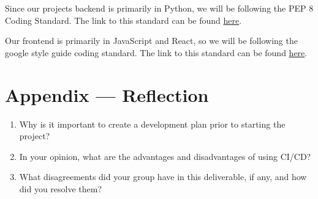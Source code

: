 \documentclass{article}
\begin{document}
Since our projects backend is primarily in Python, we will be following the PEP 8 Coding
Standard. The link to this standard can be found
\href{https://peps.python.org/pep-0008/}{here}.

\medskip

Our frontend is primarily in JavaScript and React, so we will be following the google style guide
coding standard. The link to this standard can be found \href{https://google.github.io/styleguide/jsguide.html}{here}.

\newpage{}

\section*{Appendix --- Reflection}

%

\begin{enumerate}
    \item Why is it important to create a development plan prior to starting the
    project?
    \item In your opinion, what are the advantages and disadvantages of using
    CI/CD?
    \item What disagreements did your group have in this deliverable, if any,
    and how did you resolve them?
\end{enumerate}
\end{document}
